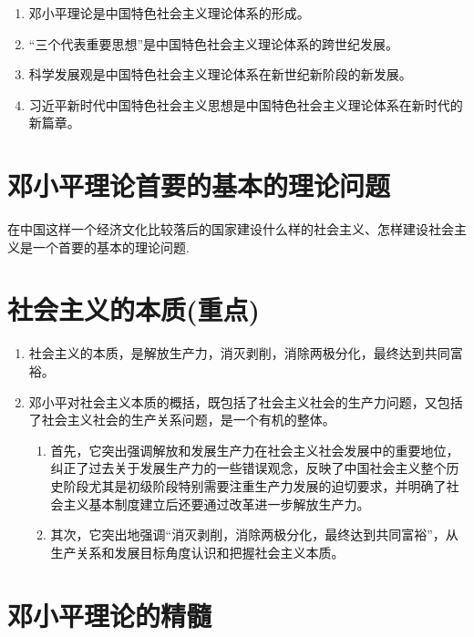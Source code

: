 \documentclass[12pt, a4paper, oneside]{ctexbook}
\begin{document}
\begin{enumerate}
\item 邓小平理论是中国特色社会主义理论体系的形成。

\item “三个代表重要思想”是中国特色社会主义理论体系的跨世纪发展。

\item 科学发展观是中国特色社会主义理论体系在新世纪新阶段的新发展。

\item 习近平新时代中国特色社会主义思想是中国特色社会主义理论体系在新时代的新篇章。
\end{enumerate}

\section{邓小平理论首要的基本的理论问题}

在中国这样一个经济文化比较落后的国家建设什么样的社会主义、怎样建设社会主义是一个首要的基本的理论问题.

\section{社会主义的本质(重点)}

\begin{enumerate}
\item 社会主义的本质，是解放生产力，消灭剥削，消除两极分化，最终达到共同富裕。

\item 邓小平对社会主义本质的概括，既包括了社会主义社会的生产力问题，又包括了社会主义社会的生产关系问题，是一个有机的整体。

\begin{enumerate}[label=(\arabic*)]
\item 首先，它突出强调解放和发展生产力在社会主义社会发展中的重要地位，纠正了过去关于发展生产力的一些错误观念，反映了中国社会主义整个历史阶段尤其是初级阶段特别需要注重生产力发展的迫切要求，并明确了社会主义基本制度建立后还要通过改革进一步解放生产力。

\item 其次，它突出地强调“消灭剥削，消除两极分化，最终达到共同富裕”，从生产关系和发展目标角度认识和把握社会主义本质。
\end{enumerate}
\end{enumerate}

\section{邓小平理论的精髓}
\end{document}

